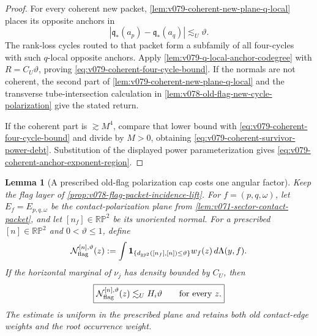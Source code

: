 \documentclass[10pt]{article}
\newtheorem{lemma}[theorem]{Lemma}
\begin{document}
\begin{proof}
For every coherent new packet,
\cref{lem:v079-coherent-new-plane-q-local} places its opposite anchors in
\[
|\mathfrak q_*(a_p)-\mathfrak q_*(a_q)|
\lesssim_U\vartheta.
\]
The rank-loss cycles routed to that packet form a subfamily of all four-cycles with such
\(q\)-local opposite anchors.  Apply
\cref{lem:v079-q-local-anchor-codegree} with \(R=C_U\vartheta\), proving
\eqref{eq:v079-coherent-four-cycle-bound}.  If the normals are not coherent, the second part of
\cref{lem:v079-coherent-new-plane-q-local} and the transverse tube-intersection calculation in
\cref{lem:v078-old-flag-new-cycle-polarization} give the stated return.

If the coherent part is \(\gtrsim M^4\), compare that lower bound with
\eqref{eq:v079-coherent-four-cycle-bound} and divide by \(M>0\), obtaining
\eqref{eq:v079-coherent-survivor-power-debt}.  Substitution of the displayed power
parameterization gives \eqref{eq:v079-coherent-anchor-exponent-region}.
\end{proof}

\begin{lemma}[A prescribed old-flag polarization cap costs one angular factor]
\label{lem:v080-old-flag-normal-cap}
Keep the flag layer of
\cref{prop:v078-flag-packet-incidence-lift}.  For
\(f=(p,q,\omega)\), let \(E_f=E_{p,q,\omega}\) be the contact-polarization plane from
\cref{lem:v071-sector-contact-packet}, and let
\([n_f]\in\mathbb {RP}^2\) be its unoriented normal.  For a prescribed
\([n]\in\mathbb {RP}^2\) and \(0<\vartheta\le1\), define
\[
\mathcal N_{\rm flag}^{[n],\vartheta}(z)
:=
\int
\mathbf 1_{\{d_{\mathbb {RP}^2}([n_f],[n])\le\vartheta\}}
w_f(z)\,d\Lambda(y,f).
\]
If the horizontal marginal of \(\nu_j\) has density bounded by \(C_U\), then
\begin{equation}
\label{eq:v080-old-flag-normal-cap}
\boxed{
\mathcal N_{\rm flag}^{[n],\vartheta}(z)
\lesssim_U
H_i\vartheta
\qquad\text{for every }z.
}
\end{equation}
The estimate is uniform in the prescribed plane and retains both old contact-edge weights and the
root occurrence weight.
\end{lemma}
\end{document}
